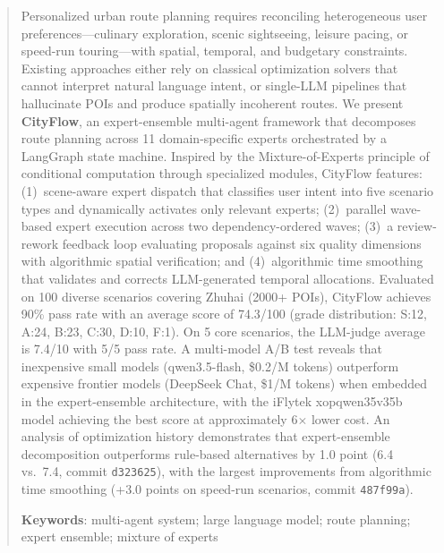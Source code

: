 \renewcommand{\abstractname}{Abstract}
\begin{abstract}
Personalized urban route planning requires reconciling heterogeneous user preferences---culinary exploration, scenic sightseeing, leisure pacing, or speed-run touring---with spatial, temporal, and budgetary constraints. Existing approaches either rely on classical optimization solvers that cannot interpret natural language intent, or single-LLM pipelines that hallucinate POIs and produce spatially incoherent routes. We present \textbf{CityFlow}, an expert-ensemble multi-agent framework that decomposes route planning across 11 domain-specific experts orchestrated by a LangGraph state machine. Inspired by the Mixture-of-Experts principle of conditional computation through specialized modules, CityFlow features: (1)~scene-aware expert dispatch that classifies user intent into five scenario types and dynamically activates only relevant experts; (2)~parallel wave-based expert execution across two dependency-ordered waves; (3)~a review-rework feedback loop evaluating proposals against six quality dimensions with algorithmic spatial verification; and (4)~algorithmic time smoothing that validates and corrects LLM-generated temporal allocations. Evaluated on 100 diverse scenarios covering Zhuhai (2000+ POIs), CityFlow achieves 90\% pass rate with an average score of 74.3/100 (grade distribution: S:12, A:24, B:23, C:30, D:10, F:1). On 5 core scenarios, the LLM-judge average is 7.4/10 with 5/5 pass rate. A multi-model A/B test reveals that inexpensive small models (qwen3.5-flash, \$0.2/M tokens) outperform expensive frontier models (DeepSeek Chat, \$1/M tokens) when embedded in the expert-ensemble architecture, with the iFlytek xopqwen35v35b model achieving the best score at approximately 6$\times$ lower cost. An analysis of optimization history demonstrates that expert-ensemble decomposition outperforms rule-based alternatives by 1.0 point (6.4 vs.\ 7.4, commit \texttt{d323625}), with the largest improvements from algorithmic time smoothing (+3.0 points on speed-run scenarios, commit \texttt{487f99a}).

\textbf{Keywords}: multi-agent system; large language model; route planning; expert ensemble; mixture of experts
\end{abstract}
